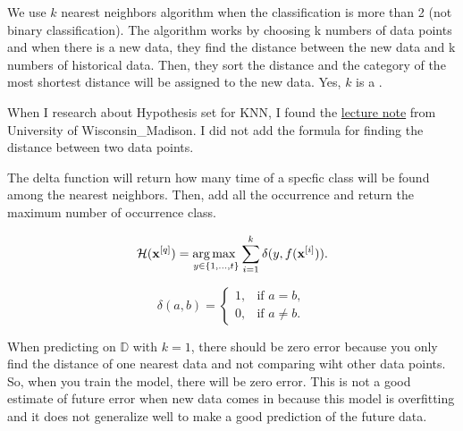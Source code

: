 \documentclass[12pt]{article}
\begin{document}
\begin{enumerate}


We use $k$ nearest neighbors algorithm when the classification is more than 2 (not binary classification). The algorithm works by choosing k numbers of data points and when there is a new data, they find the distance between the new data and k numbers of historical data. Then, they sort the distance and the category of the most shortest distance will be assigned to the new data. Yes, $k$ is a .


When I research about Hypothesis set for KNN, I found the \href{https://sebastianraschka.com/pdf/lecture-notes/stat479fs18/02_knn_notes.pdf}{lecture note} from University of Wisconsin\_Madison. I did not add the formula for finding the distance between two data points. 

The delta function will return how many time of a specfic class will be found among the nearest neighbors. Then, add all the occurrence and return the maximum number of occurrence class.


\[
\mathcal{H}(\mathbf{x}^{[q]}) = \operatorname*{arg\,max~}\limits_{y \in \{1, \dots, t\}} \sum_{i=1}^{k} \delta(y, f(\mathbf{x}^{[i]})).
\]


\[
\delta(a, b) =
\begin{cases}
1, & \text{if } a = b, \\
0, & \text{if } a \neq b.
\end{cases}
\]





When predicting on $\mathbb{D}$ with $k = 1$, there should be zero error because you only find the distance of one nearest data and not comparing wiht other data points. So, when you train the model, there will be zero error. This is not a good estimate of future error when new data comes in because this model is overfitting and it does not generalize well to make a good prediction of the future data.

\end{enumerate}
\end{document}
